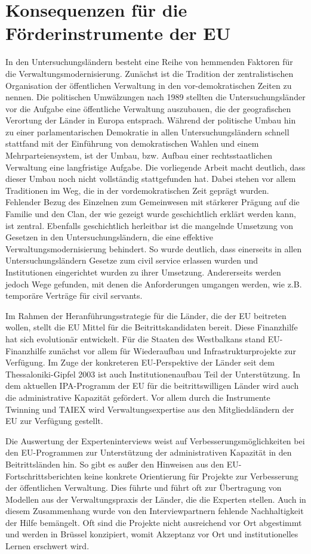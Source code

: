 \section{Konsequenzen für die Förderinstrumente der EU}
In den Untersuchungsländern besteht eine Reihe von hemmenden Faktoren für die Verwaltungsmodernisierung. Zunächst ist die Tradition der zentralistischen Organisation der öffentlichen Verwaltung in den vor-demokratischen Zeiten zu nennen. Die politischen Umwälzungen nach 1989 stellten die Untersuchungsländer vor die Aufgabe eine öffentliche Verwaltung auszubauen, die der geografischen Verortung der Länder in Europa entsprach. Während der politische Umbau hin zu einer parlamentarischen Demokratie in allen Untersuchungsländern schnell stattfand mit der Einführung von demokratischen Wahlen und einem Mehrparteiensystem, ist der Umbau, bzw. Aufbau einer rechtsstaatlichen Verwaltung eine langfristige Aufgabe. Die vorliegende Arbeit macht deutlich, dass dieser Umbau noch nicht vollständig stattgefunden hat. Dabei stehen vor allem Traditionen im Weg, die in der vordemokratischen Zeit geprägt wurden. Fehlender Bezug des Einzelnen zum Gemeinwesen mit stärkerer Prägung auf die Familie und den Clan, der wie gezeigt wurde geschichtlich erklärt werden kann, ist zentral. Ebenfalls geschichtlich herleitbar ist die mangelnde Umsetzung von Gesetzen in den Untersuchungsländern, die eine effektive Verwaltungsmodernisierung behindert. So wurde deutlich, dass einerseits in allen Untersuchungsländern Gesetze zum civil service erlassen wurden und Institutionen eingerichtet wurden zu ihrer Umsetzung. Andererseits werden jedoch Wege gefunden, mit denen die Anforderungen umgangen werden, wie z.B. temporäre Verträge für civil servants.\par
Im Rahmen der Heranführungsstrategie für die Länder, die der EU beitreten wollen, stellt die EU Mittel für die Beitrittskandidaten bereit. Diese Finanzhilfe hat sich evolutionär entwickelt. Für die Staaten des Westbalkans stand EU-Finanzhilfe zunächst vor allem für Wiederaufbau und Infrastrukturprojekte zur Verfügung. Im Zuge der konkreteren EU-Perspektive der Länder seit dem Thessaloniki-Gipfel 2003 ist auch Institutionenaufbau Teil der Unterstützung. In dem aktuellen IPA-Programm der EU für die beitrittswilligen Länder wird auch die administrative Kapazität gefördert. Vor allem durch die Instrumente Twinning und TAIEX wird Verwaltungsexpertise aus den Mitgliedsländern der EU zur Verfügung gestellt.\par
Die Auswertung der Experteninterviews weist auf Verbesserungsmöglichkeiten bei den EU-Programmen zur Unterstützung der administrativen Kapazität in den Beitrittsländen hin. So gibt es außer den Hinweisen aus den EU-Fortschrittsberichten keine konkrete Orientierung für Projekte zur Verbesserung der öffentlichen Verwaltung. Dies führte und führt oft zur Übertragung von Modellen aus der Verwaltungspraxis der Länder, die die Experten stellen. Auch in diesem Zusammenhang wurde von den Interviewpartnern fehlende Nachhaltigkeit der Hilfe bemängelt. Oft sind die Projekte nicht ausreichend vor Ort abgestimmt und werden in Brüssel konzipiert, womit Akzeptanz vor Ort und institutionelles Lernen erschwert wird.\par
